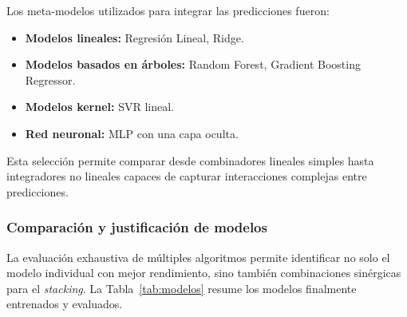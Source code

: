 Los meta-modelos utilizados para integrar las predicciones fueron:

\begin{itemize}
    \item \textbf{Modelos lineales:} Regresión Lineal, Ridge.
    \item \textbf{Modelos basados en árboles:} Random Forest, Gradient Boosting Regressor.
    \item \textbf{Modelos kernel:} SVR lineal.
    \item \textbf{Red neuronal:} MLP con una capa oculta.
\end{itemize}

Esta selección permite comparar desde combinadores lineales simples hasta integradores no lineales capaces de capturar interacciones complejas entre predicciones.

\subsubsection{Comparación y justificación de modelos}

La evaluación exhaustiva de múltiples algoritmos permite identificar no solo el modelo individual con mejor rendimiento, sino también combinaciones sinérgicas para el \textit{stacking}. La Tabla~\ref{tab:modelos} resume los modelos finalmente entrenados y evaluados.


